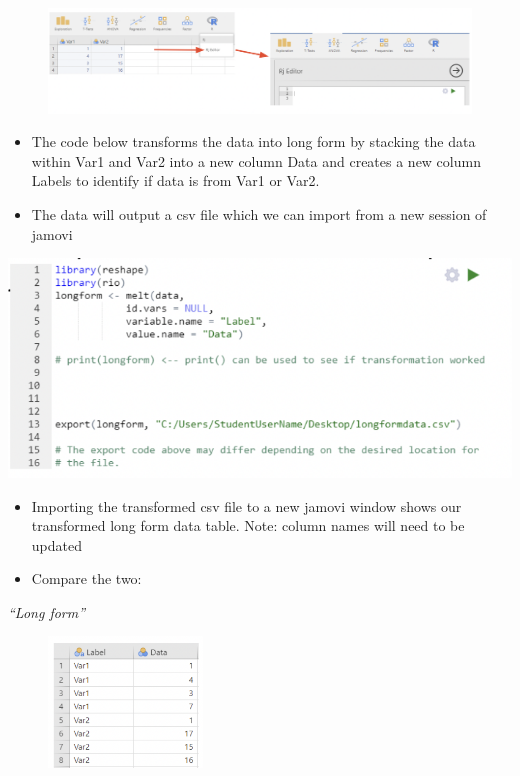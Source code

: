 \documentclass[
  letterpaper,
  DIV=11,
  numbers=noendperiod]{scrreprt}
\begin{document}
\begin{figure}

{\centering \includegraphics{images/mod1_23.png}

}

\end{figure}

\begin{itemize}
\item
  The code below transforms the data into long form by stacking the data
  within Var1 and Var2 into a new column Data and creates a new column
  Labels to identify if data is from Var1 or Var2.
\item
  The data will output a csv file which we can import from a new session
  of jamovi
\end{itemize}

\includegraphics{images/mod1_24.png}

\begin{itemize}
\item
  Importing the transformed csv file to a new jamovi window shows our
  transformed long form data table. Note: column names will need to be
  updated
\item
  Compare the two:
\end{itemize}

\emph{``Long form''}

\begin{figure}

\includegraphics[width=1.61458in,height=\textheight]{images/mod1_25.png} \hfill{}

\end{figure}
\end{document}
